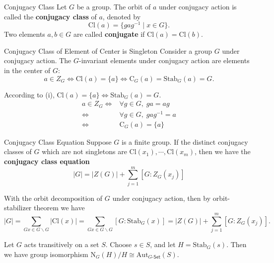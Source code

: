 \begin{definition}{Conjugacy Class}{}
    Let $G$ be a group. The orbit of $a$ under conjugacy action is called the \textbf{conjugacy class} of $a$, denoted by
    \[
        \mathrm{Cl}(a)=\{ gag^{-1}\mid x\in G   \}.
    \]
    Two elements $a,b\in G$ are called \textbf{conjugate} if $\mathrm{Cl}(a)=\mathrm{Cl}(b)$.
\end{definition}


\begin{proposition}{Conjugacy Class of Element of Center is Singleton}{}
    Consider a group $G$ under conjugacy action. The $G$-invariant elements under conjugacy action are elements in the center of $G$:
    \[
        a\in Z_G\iff \mathrm{Cl}(a)=\{ a\}\iff \mathrm{C}_G(a)=\mathrm{Stab}_G(a)=G.
    \]
\end{proposition}
\begin{prf}
    According to  (i), $\mathrm{Cl}(a)=\{ a\}\iff \mathrm{Stab}_G(a)=G$.
    $$
        \begin{aligned}
            a  \in Z_G \iff & \forall g \in G,\;g a  =a g     \\
            \iff            & \forall g \in G,\;g a g^{-1} =a \\
            \iff            & \mathrm{C}_G(a) =\{a\}
        \end{aligned}
    $$
\end{prf}

\begin{proposition}{Conjugacy Class Equation}{}
    Suppose $G$ is a finite group. If the distinct conjugacy classes of $G$ which are not singletons are $\mathrm{Cl}(x_1),\cdots,\mathrm{Cl}(x_m)$, then we have the \textbf{conjugacy class equation}
    \[
        |G|=|Z(G)|+\sum_{j=1}^m\left[G: Z_G\left(x_j\right)\right]
    \]
\end{proposition}
\begin{prf}
    With the orbit decomposition of $G$ under conjugacy action, then by orbit-stabilizer theorem we have
    \[
        |G|=\sum_{Gx\in G\backslash G}\left|\mathrm{Cl}(x)\right|=\sum_{Gx\in G\backslash G}\left[G: \mathrm{Stab}_G(x)\right]=|Z(G)|+\sum_{j=1}^m\left[G: Z_G\left(x_j\right)\right].
    \]
\end{prf}

\begin{proposition}{}{}
    Let $G$ acts transitively on a set $S$. Choose $s \in S$, and let $H = \mathrm{Stab}_G(s)$. Then we have group isomorphism $\mathrm{N}_G(H)/H\cong \mathrm{Aut}_{G\text{-}\mathsf{Set}}(S)$.
\end{proposition}

